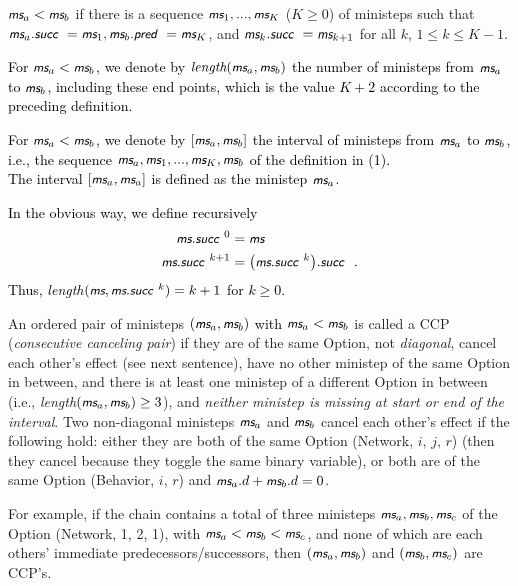 \documentclass[a4paper,12pt,fleqn]{article}
\newcommand{\nnm}[1]{\textsf{\small\textit{#1}\ }}
\newcommand{\ms}{\textsl{\textsf{\small ms}}} %
\newcommand{\adda}[1]{{#1}}  %
\newcommand{\addaa}[1]{{\textcolor[named]{Black}{#1}}}  %
\begin{document}
\begin{enumerate}
\item $\ms_a < \ms_b$ if there is a sequence $\ms_1, ..., \ms_K$ ($K \geq 0$) of ministeps
      such that $\ms_a.\nnm{succ} = \ms_1, \ms_b.\nnm{pred}= \ms_K$,
      and $\ms_k.\nnm{succ} = \ms_{k+1}$
      for all $k$, $1 \leq k \leq K-1$.
\addaa{
\item For $\ms_a < \ms_b$, we denote by $\textit{length}(\ms_a, \ms_b)$
      the number of ministeps from $\ms_a$ to $\ms_b$,
      including these end points,
      which is the value $K+2$ according to the preceding definition.
\item For $\ms_a < \ms_b$, we denote by $[\ms_a, \ms_b]$
      the interval of ministeps from $\ms_a$ to $\ms_b$,
       i.e., the sequence
      $\ms_a, \ms_1, ..., \ms_K, \ms_b$
      of the definition in (1).\\
      The interval $[\ms_a, \ms_a]$ is defined as the ministep $\ms_a$.
\item In the obvious way, we define recursively
      \begin{align}
        \ms.\nnm{succ}^0 &=  \ms  \\
        \ms.\nnm{succ}^{k+1} &=  \big(\ms.\nnm{succ}^k\big).\nnm{succ} \ .
      \end{align}
      Thus, \textit{length}$(\ms, \ms.\nnm{succ}^{k}) = k+1$ for $k \geq 0$.
}
\end{enumerate}

An ordered pair of ministeps
\addaa{$(\ms_a, \ms_b)$ with $\ms_a < \ms_b$}
is called a CCP (\emph{consecutive canceling pair})
if they are of the same \adda{Option}, not \textit{diagonal},
cancel each other's effect (see next sentence),
have no other ministep of the same \adda{Option} in between,
and there is at least one ministep of a
different \adda{Option} in between
(i.e., \textit{length}$(\ms_a, \ms_b) \geq 3$), and \emph{neither ministep is
  missing at start or end of the interval}.
Two non-diagonal ministeps $\ms_a$ and $\ms_b$ cancel each other's effect
if the following hold: either they are both of the same \adda{Option}
(Network, $i,\, j,\, r$) (then they cancel because they toggle the same
binary variable), or both are of the same \adda{Option} (Behavior, $i, \, r$)
and $\ms_a.d + \ms_b.d = 0$.

For example, if the chain contains a total of three ministeps
$\ms_a, \ms_b, \ms_c$
of the \adda{Option} (Network, 1, 2, 1), with $\ms_a < \ms_b < \ms_c$,
and none of which are each others' immediate predecessors/successors,
then $(\ms_a, \ms_b)$ and $(\ms_b, \ms_c)$ are CCP's.
\end{document}
